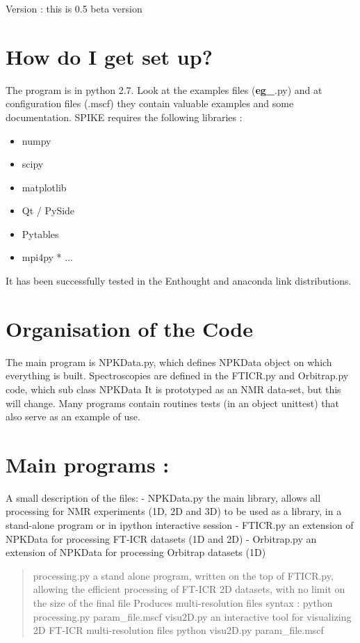 \documentclass[letterpaper,10pt,openany,oneside]{sphinxmanual}
\begin{document}
Version : this is 0.5 beta version


\section{How do I get set up?}
\label{rst/introduction:how-do-i-get-set-up}
The program is in python 2.7.
Look at the examples files ({\color{red}\bfseries{}eg\_}.py) and at configuration files (.mscf) they contain valuable examples and some documentation.
SPIKE requires the following libraries :
\begin{itemize}
\item {} 
numpy

\item {} 
scipy

\item {} 
matplotlib

\item {} 
Qt / PySide

\item {} 
Pytables

\item {} 
mpi4py * ...

\end{itemize}

It has been successfully tested in the Enthought and anaconda link distributions.


\section{Organisation of the Code}
\label{rst/introduction:organisation-of-the-code}
The main program is NPKData.py, which defines NPKData object on which everything is built.
Spectroscopies are defined in the FTICR.py and Orbitrap.py code, which sub class NPKData It is prototyped as an NMR data-set, but this will change.
Many programs contain routines tests (in an object unittest) that also serve as an example of use.


\section{Main programs :}
\label{rst/introduction:main-programs}
A small description of the files: - NPKData.py the main library, allows all processing for NMR experiments (1D, 2D and 3D) to be used as a library, in a stand-alone program or in ipython interactive session - FTICR.py an extension of NPKData for processing FT-ICR datasets (1D and 2D) - Orbitrap.py an extension of NPKData for processing Orbitrap datasets (1D)
\begin{quote}

processing.py a stand alone program, written on the top of FTICR.py, allowing the efficient processing of FT-ICR 2D datasets, with no limit on the size of the final file Produces multi-resolution files syntax : python processing.py param\_file.mscf
visu2D.py an interactive tool for visualizing 2D FT-ICR multi-resolution files python visu2D.py param\_file.mscf
\end{quote}
\end{document}
